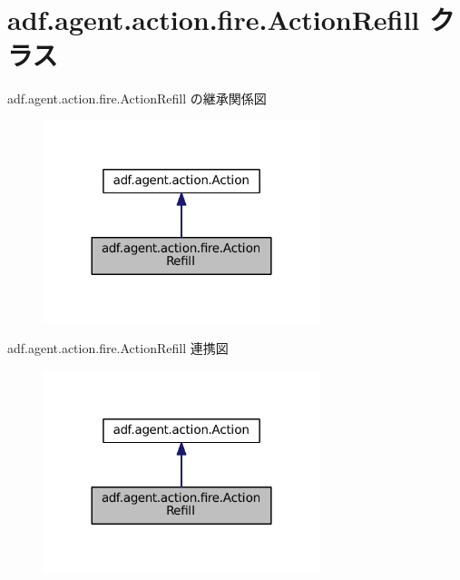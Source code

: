 \hypertarget{classadf_1_1agent_1_1action_1_1fire_1_1ActionRefill}{}\section{adf.\+agent.\+action.\+fire.\+Action\+Refill クラス}
\label{classadf_1_1agent_1_1action_1_1fire_1_1ActionRefill}


adf.\+agent.\+action.\+fire.\+Action\+Refill の継承関係図
\nopagebreak
\begin{figure}[H]
\begin{center}
\leavevmode
\includegraphics[width=228pt]{classadf_1_1agent_1_1action_1_1fire_1_1ActionRefill__inherit__graph}
\end{center}
\end{figure}


adf.\+agent.\+action.\+fire.\+Action\+Refill 連携図
\nopagebreak
\begin{figure}[H]
\begin{center}
\leavevmode
\includegraphics[width=228pt]{classadf_1_1agent_1_1action_1_1fire_1_1ActionRefill__coll__graph}
\end{center}
\end{figure}
